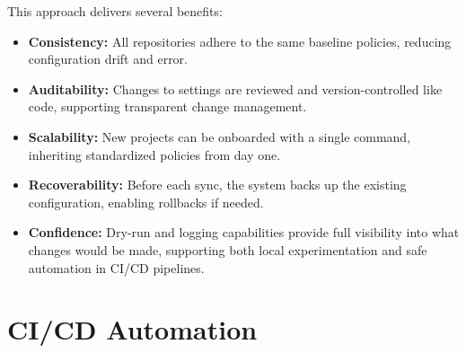 This approach delivers several benefits:
\begin{itemize}
  \item \textbf{Consistency:} All repositories adhere to the same
    baseline policies, reducing configuration drift and error.

  \item \textbf{Auditability:} Changes to settings are reviewed and
    version-controlled like code, supporting transparent change
    management.

  \item \textbf{Scalability:} New projects can be onboarded with a
    single command, inheriting standardized policies from day one.

  \item \textbf{Recoverability:} Before each sync, the system backs up the
    existing configuration, enabling rollbacks if needed.

  \item \textbf{Confidence:} Dry-run and logging capabilities provide
    full visibility into what changes would be made, supporting both
    local experimentation and safe automation in CI/CD pipelines.
\end{itemize}

\section{CI/CD Automation}


